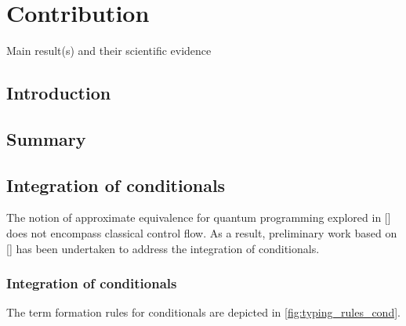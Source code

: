 \chapter{Contribution}

Main result(s) and their scientific evidence

\section{Introduction}

\section{Summary}


\section{Integration of conditionals}

The notion of approximate equivalence for quantum programming explored in [\cite{dahlqvist2022syntactic}] does not encompass classical control flow. As a result, preliminary work based on [\cite{crole1993categories,selinger2013lecture}]   has been undertaken to address the integration of conditionals. 

\subsection{Integration of conditionals}

The term formation rules for conditionals are depicted in
\autoref{fig:typing_rules_cond}. 

